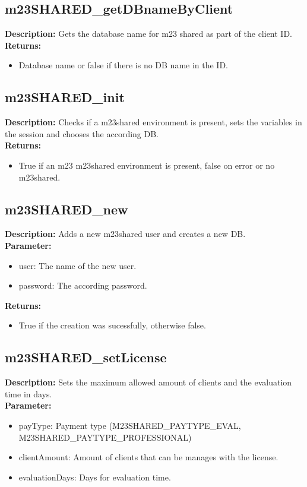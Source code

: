 \subsection{m23SHARED\_getDBnameByClient}
\textbf{Description:} Gets the database name for m23 shared as part of the client ID.\\
\textbf{Returns:}
\begin{itemize}
\item Database name or false if there is no DB name in the ID.
\end{itemize}

\subsection{m23SHARED\_init}
\textbf{Description:} Checks if a m23shared environment is present, sets the variables in the session and chooses the according DB.\\
\textbf{Returns:}
\begin{itemize}
\item True if an m23 m23shared environment is present, false on error or no m23shared.
\end{itemize}

\subsection{m23SHARED\_new}
\textbf{Description:} Adds a new m23shared user and creates a new DB.\\
\textbf{Parameter:}
\begin{itemize}
\item user: The name of the new user.
\item password: The according password.
\end{itemize}
\textbf{Returns:}
\begin{itemize}
\item True if the creation was sucessfully, otherwise false.
\end{itemize}

\subsection{m23SHARED\_setLicense}
\textbf{Description:} Sets the maximum allowed amount of clients and the evaluation time in days.\\
\textbf{Parameter:}
\begin{itemize}
\item payType: Payment type (M23SHARED\_PAYTYPE\_EVAL, M23SHARED\_PAYTYPE\_PROFESSIONAL)
\item clientAmount: Amount of clients that can be manages with the license.
\item evaluationDays: Days for evaluation time.
\end{itemize}

